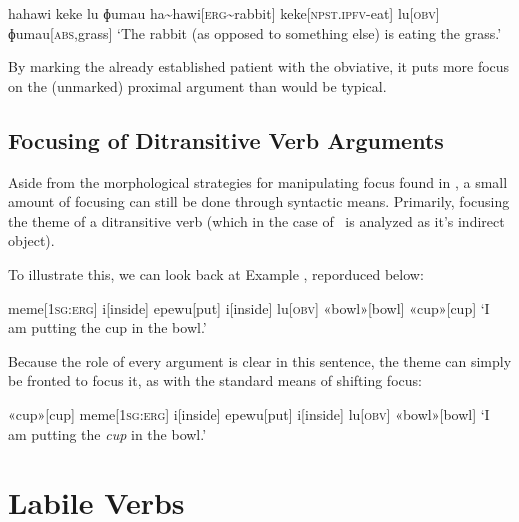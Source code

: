 \ex
\begingl
\glpreamble hahawi keke lu ɸumau
\endpreamble
ha\textasciitilde hawi[\textsc{erg\textasciitilde}rabbit]
keke[\textsc{npst.ipfv-}eat]
lu[\textsc{obv}]
ɸumau[\textsc{abs,}grass]
\glft `The rabbit (as opposed to something else) is eating the grass.'
\endgl
\xe

By marking the already established patient with the obviative\footnotemark, it puts more focus on the (unmarked) proximal argument than would be typical.


\subsection{Focusing of Ditransitive Verb Arguments}\label{sec:ditrans_focus}

Aside from the morpho­logical strategies for manipulating focus found in , a small amount of focusing can still be done through syntactic means. Primarily, focusing the theme of a ditransitive verb (which in the case of \langname\ is analyzed as it's indirect object).

To illustrate this, we can look back at Example , reporduced below:

\ex
\begingl
\glpreamble
\pronounced{}\endpreamble
meme[\textsc{1sg:erg}]
i[inside]
epewu[put]
i[inside]
lu[\textsc{obv}]
«bowl»[bowl]
«cup»[cup]
\glft `I am putting the cup in the bowl.'
\endgl
\xe

Because the role of every argument is clear in this sentence, the theme can simply be fronted to focus it, as with the standard means of shifting focus:

\ex
\begingl
\glpreamble
\pronounced{}\endpreamble
«cup»[cup]
meme[\textsc{1sg:erg}]
i[inside]
epewu[put]
i[inside]
lu[\textsc{obv}]
«bowl»[bowl]
\glft `I am putting the \textit{cup} in the bowl.'\footnotemark
\endgl
\xe


\section{Labile Verbs}\label{sec:labile_verbs}

